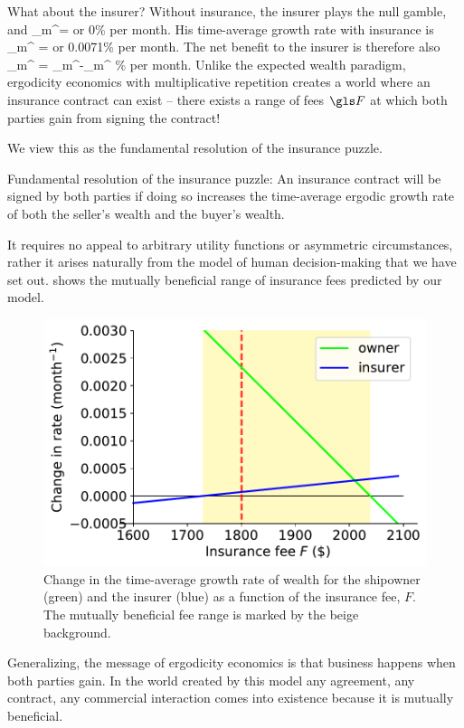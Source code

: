 What about the insurer? Without insurance, the insurer plays the null gamble, and
\be
\gt_m^{}= 
\ee
or 0\% per month. His time-average growth rate with insurance is 
\be
\gt_m^{} = 
\ee
or 0.0071\% per month. The net benefit to the insurer is therefore also
\be
\delta\gbar_m^{} = \gt_m^{}-\gt_m^{}
\ee
{}\% per month. Unlike the expected wealth paradigm, ergodicity economics 
with multiplicative repetition creates a world where an insurance contract can exist -- 
there exists a range of fees $\F$ at which both parties gain from signing the contract! 

We view this as the fundamental resolution of the insurance puzzle.
\begin{keypts}{Fundamental resolution of the insurance puzzle:}
An insurance contract will be signed by both parties if doing so 
increases the time-average ergodic growth rate
of both the seller's wealth and the buyer's wealth.
\end{keypts}
It requires no appeal to arbitrary utility functions or asymmetric circumstances, rather 
it arises naturally from the model of human decision-making that we have set out. 
 shows the mutually beneficial range of insurance fees predicted by our model.
\begin{figure}
\centering
\includegraphics[width=.5\textwidth]{./chapter_real/figs/insurance_erg.pdf}
\caption{Change in the time-average growth rate of wealth for the shipowner (green) and the insurer 
(blue) as a function of the insurance fee, $F$. The mutually beneficial fee range is marked by the beige background.}
\end{figure}

Generalizing, the message of ergodicity economics is that business happens when both parties gain.
In the world created by this model any agreement, any contract, any commercial interaction 
comes into existence because it is mutually beneficial.

